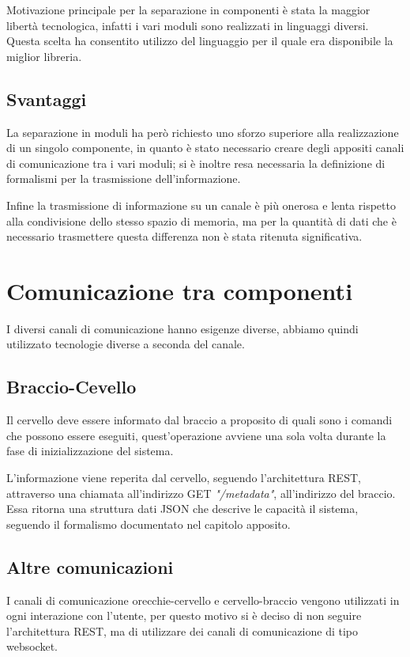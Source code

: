 \documentclass[twoside]{supsistudent}
\begin{document}
Motivazione principale per la separazione in componenti è stata la maggior libertà tecnologica, infatti i vari moduli sono realizzati in linguaggi diversi. 
Questa scelta ha consentito utilizzo del linguaggio per il quale era disponibile la miglior libreria.

\section{Svantaggi}

La separazione in moduli ha però richiesto uno sforzo superiore alla realizzazione di un singolo componente, in quanto è stato necessario creare degli appositi canali di comunicazione tra i vari moduli; si è inoltre resa necessaria la definizione di formalismi per la trasmissione dell'informazione.

Infine la trasmissione di informazione su un canale è più onerosa e lenta rispetto alla condivisione dello stesso spazio di memoria, ma per la quantità di dati che è necessario trasmettere questa differenza non è stata ritenuta significativa.

\chapter{Comunicazione tra componenti}
I diversi canali di comunicazione hanno esigenze diverse, abbiamo quindi utilizzato tecnologie diverse a seconda del canale.

\section{Braccio-Cevello}
Il cervello deve essere informato dal braccio a proposito di quali sono i comandi che possono essere eseguiti, quest'operazione avviene una sola volta durante la fase di inizializzazione del sistema.

L'informazione viene reperita dal cervello, seguendo l'architettura REST, attraverso una chiamata all'indirizzo GET \textit{"/metadata"}, all'indirizzo del braccio. Essa ritorna una struttura dati JSON che descrive le capacità il sistema, seguendo il formalismo documentato nel capitolo apposito.
\section{Altre comunicazioni}
I canali di comunicazione orecchie-cervello e cervello-braccio vengono utilizzati in ogni interazione con l'utente, per questo motivo si è deciso di non seguire l'architettura REST, ma di utilizzare dei canali di comunicazione di tipo websocket.
\end{document}
